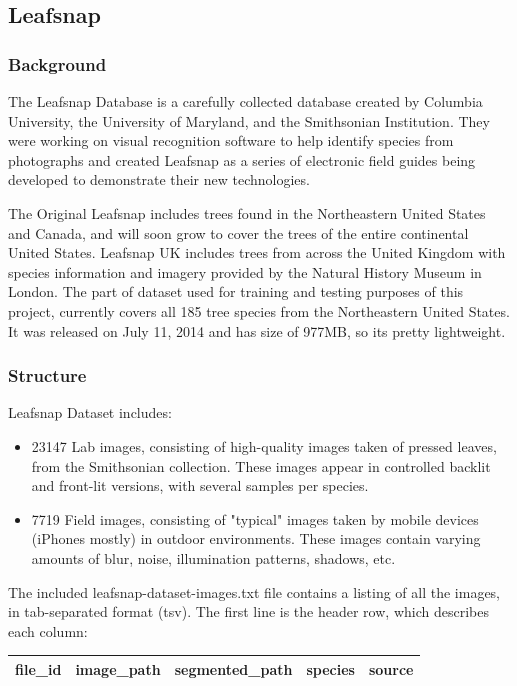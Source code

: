 \documentclass[../Main.tex]{subfiles}
\begin{document}
\subsection{Leafsnap}

    \subsubsection{Background}
    The Leafsnap Database is a carefully collected database created by Columbia University, the University of Maryland, and the Smithsonian Institution. They were working on visual recognition software to help identify species from photographs and created Leafsnap as a series of electronic field guides being developed to demonstrate their new technologies. \cite{leafsnap_eccv2012} 
    
    The Original Leafsnap includes trees found in the Northeastern United States and Canada, and will soon grow to cover the trees of the entire continental United States. Leafsnap UK includes trees from across the United Kingdom with species information and imagery provided by the Natural History Museum in London. The part of dataset used for training and testing purposes of this project, currently covers all 185 tree species from the Northeastern United States. It was released on July 11, 2014 and has size of 977MB, so its pretty lightweight.
    
    \subsubsection{Structure}
    Leafsnap Dataset includes: \cite{leafsnap-db}
    \begin{itemize}
        \item 23147 Lab images, consisting of high-quality images taken of pressed leaves, from the Smithsonian collection. These images appear in controlled backlit and front-lit versions, with several samples per species.
        \item 7719 Field images, consisting of "typical" images taken by mobile devices (iPhones mostly) in outdoor environments. These images contain varying amounts of blur, noise, illumination patterns, shadows, etc.
    \end{itemize}
    
    The included leafsnap-dataset-images.txt file contains a listing of all the images, in tab-separated format (tsv). The first line is the header row, which describes each column:
    \begin{center}
        \begin{tabular}{ |c|c|c|c|c| } 
             \hline
             file\_id & image\_path & segmented\_path & species & source \\
             \hline
        \end{tabular}
    \end{center}
    
\end{document}
